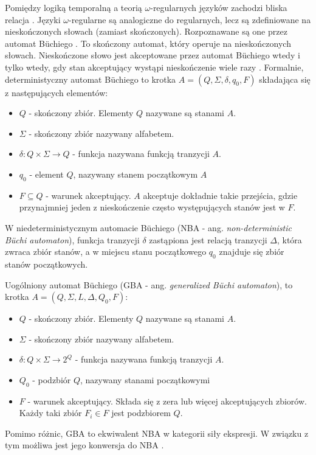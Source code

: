 Pomiędzy logiką temporalną a teorią $\omega$-regularnych języków zachodzi bliska relacja \cite{Sis83}\cite{Wol83}.
Języki $\omega$-regularne są analogiczne do regularnych, lecz są zdefiniowane na nieskończonych słowach (zamiast skończonych).
Rozpoznawane są one przez automat Büchiego \cite{Buch66}.
To skończony automat, który operuje na nieskończonych słowach.
Nieskończone słowo jest akceptowane przez automat Büchiego wtedy i tylko wtedy, gdy stan akceptujący wystąpi nieskończenie wiele razy \cite{Sis87}.
Formalnie, deterministyczny automat Büchiego to krotka $A = (Q,\Sigma,\delta,q_0,F)$ składająca się z następujących elementów:
\begin{itemize}
\item $Q$ - skończony zbiór. Elementy $Q$ nazywane są stanami $A$.
\item $\Sigma$ - skończony zbiór nazywany alfabetem.
\item $\delta: Q \times \Sigma \rightarrow Q$ - funkcja nazywana funkcją tranzycji $A$.
\item $q_0$ - element $Q$, nazywany stanem początkowym $A$
\item $F \subseteq Q$ - warunek akceptujący. $A$ akceptuje dokładnie takie przejścia, gdzie przynajmniej jeden z nieskończenie często występujących stanów jest w $F$.
\end{itemize}
W niedeterministycznym automacie Büchiego (NBA - ang. \textit{non-deterministic Büchi automaton}), funkcja tranzycji $\delta$ zastąpiona jest relacją tranzycji $\Delta$, która zwraca zbiór stanów, a w miejscu stanu początkowego $q_0$ znajduje się zbiór stanów początkowych.

Uogólniony automat Büchiego (GBA - ang. \textit{generalized Büchi automaton}), to krotka $A = (Q,\Sigma,L,\Delta,Q_0,F)$:
\begin{itemize}
\item $Q$ - skończony zbiór. Elementy $Q$ nazywane są stanami $A$.
\item $\Sigma$ - skończony zbiór nazywany alfabetem.
\item $\delta: Q \times \Sigma \rightarrow 2^Q$ - funkcja nazywana funkcją tranzycji $A$.
\item $Q_0$ - podzbiór $Q$, nazywany stanami początkowymi
\item $F$ - warunek akceptujący. Składa się z zera lub więcej akceptujących zbiorów. Każdy taki zbiór $F_i \in F$ jest podzbiorem $Q$.
\end{itemize}
Pomimo różnic, GBA to ekwiwalent NBA w kategorii siły ekspresji.
W związku z tym możliwa jest jego konwersja do NBA \cite{Mer14}\cite{Dol95}.

